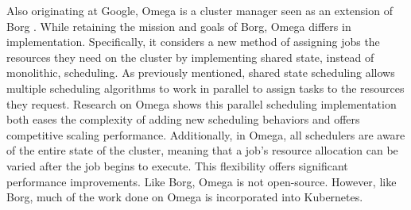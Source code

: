 Also originating at Google, Omega is a cluster manager seen as
an extension of Borg \cite{omega}. While retaining the mission and goals of Borg,
Omega differs in implementation. Specifically, it considers a new method of
assigning jobs the resources they need on the cluster by implementing
shared state, instead of monolithic, scheduling. As previously mentioned,
shared state scheduling allows multiple scheduling algorithms to work
in parallel to assign tasks to the resources they request. Research on Omega shows
this parallel scheduling implementation both eases the complexity of adding new
scheduling behaviors and offers competitive scaling performance.
Additionally, in Omega, all schedulers are aware of the entire
state of the cluster, meaning that a job's resource allocation can be
varied after the job begins to execute. This flexibility offers significant
performance improvements. Like Borg, Omega is not
open-source. However, like Borg, much of the work done on Omega is incorporated
into Kubernetes.

